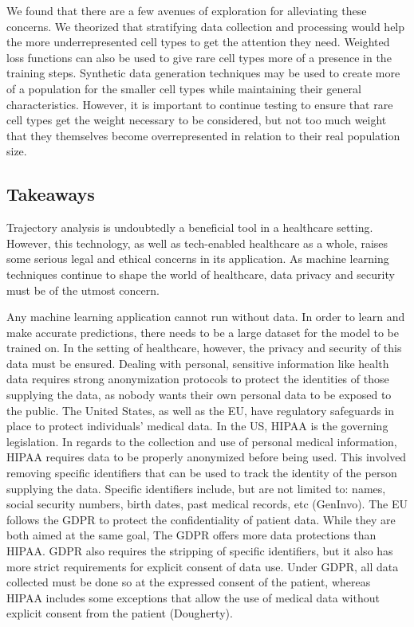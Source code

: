 \documentclass{article}
\begin{document}
We found that there are a few avenues of exploration for alleviating these concerns. We theorized that stratifying data collection and processing would help the more underrepresented cell types to get the attention they need. Weighted loss functions can also be used to give rare cell types more of a presence in the training steps. Synthetic data generation techniques may be used to create more of a population for the smaller cell types while maintaining their general characteristics. However, it is important to continue testing to ensure that rare cell types get the weight necessary to be considered, but not too much weight that they themselves become overrepresented in relation to their real population size. 


\subsection{Takeaways}
Trajectory analysis is undoubtedly a beneficial tool in a healthcare setting.  However, this technology, as well as tech-enabled healthcare as a whole, raises some serious legal and ethical concerns in its application.  As machine learning techniques continue to shape the world of healthcare, data privacy and security must be of the utmost concern.

Any machine learning application cannot run without data.  In order to learn and make accurate predictions, there needs to be a large dataset for the model to be trained on.  In the setting of healthcare, however, the privacy and security of this data must be ensured.  Dealing with personal, sensitive information like health data requires strong anonymization protocols to protect the identities of those supplying the data, as nobody wants their own personal data to be exposed to the public.  The United States, as well as the EU, have regulatory safeguards in place to protect individuals’ medical data.  In the US, HIPAA is the governing legislation.  In regards to the collection and use of personal medical information, HIPAA requires data to be properly anonymized before being used.  This involved removing specific identifiers that can be used to track the identity of the person supplying the data.  Specific identifiers include, but are not limited to: names, social security numbers, birth dates, past medical records, etc (GenInvo).  The EU follows the GDPR to protect the confidentiality of patient data.  While they are both aimed at the same goal, The GDPR offers more data protections than HIPAA.  GDPR also requires the stripping of specific identifiers, but it also has more strict requirements for explicit consent of data use.  Under GDPR, all data collected must be done so at the expressed consent of the patient, whereas HIPAA includes some exceptions that allow the use of medical data without explicit consent from the patient (Dougherty).
\end{document}
